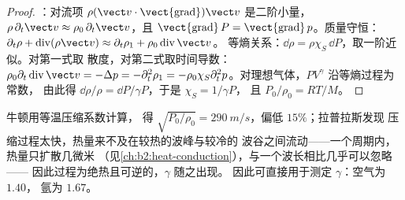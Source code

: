 \begin{proof}
：对流项 $\rho(\vect v\cdot\operatorname{\vect{grad}})\vect v$
是二阶小量，$\rho\,\partial_t\vect v \approx \rho_0\,\partial_t\vect v$，且
$\operatorname{\vect{grad}}P = \operatorname{\vect{grad}}p$。质量守恒：$\partial_t\rho +
\operatorname{div}(\rho\vect v) \approx \partial_t\rho_1 + \rho_0\operatorname{div}\vect v$。
等熵关系：$\dd\rho = \rho\chi_S\,\dd P$，取一阶近似。对第一式取
散度，对第二式取时间导数：
$\rho_0\partial_t\operatorname{div}\vect v = -\Delta p = -\partial_t^2\rho_1 = -\rho_0\chi_S
\partial_t^2p$。对理想气体，$PV^\gamma$ 沿等熵过程为常数，
由此得 $\dd\rho/\rho = \dd P/\gamma P$，于是 $\chi_S = 1/\gamma P$，
且 $P_0/\rho_0 = RT/M$。
\end{proof}

\begin{remark}[为何是等熵的]\label{rem:b2:sound-waves:laplace}
牛顿用等温压缩系数计算，
得 $\sqrt{P_0/\rho_0} = \qty{290}{m/s}$，偏低 $15\%$；拉普拉斯发现
压缩过程太快，热量来不及在较热的波峰与较冷的
波谷之间流动——一个周期内，热量只扩散几微米
（见\cref{ch:b2:heat-conduction}），与一个波长相比几乎可以忽略——
因此过程为绝热且可逆的，$\gamma$ 随之出现。
因此可直接用于测定 $\gamma$：空气为 $1.40$，
氩为 $1.67$。
\end{remark}

